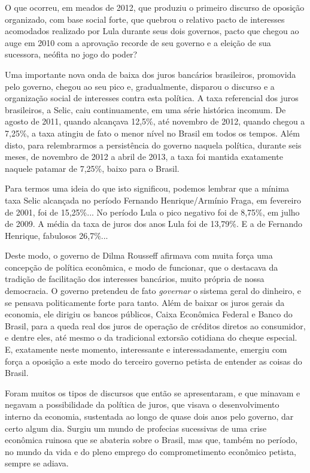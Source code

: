 O que ocorreu, em meados de 2012, que produziu o primeiro discurso de
oposição organizado, com base social forte, que quebrou o relativo pacto
de interesses acomodados realizado por Lula durante seus dois governos,
pacto que chegou ao auge em 2010 com a aprovação recorde de seu governo
e a eleição de sua sucessora, neófita no jogo do poder?

Uma importante nova onda de baixa dos juros bancários brasileiros,
promovida pelo governo, chegou ao seu pico e, gradualmente, disparou o
discurso e a organização social de interesses contra esta política. A
taxa referencial dos juros brasileiros, a Selic, caiu continuamente, em
uma série histórica incomum. De agosto de 2011, quando alcançava 12,5\%,
até novembro de 2012, quando chegou a 7,25\%, a taxa atingiu de fato o
menor nível no Brasil em todos os tempos. Além disto, para relembrarmos
a persistência do governo naquela política, durante seis meses, de
novembro de 2012 a abril de 2013, a taxa foi mantida exatamente naquele
patamar de 7,25\%, baixo para o Brasil.

Para termos uma ideia do que isto significou, podemos lembrar que a
mínima taxa Selic alcançada no período Fernando Henrique/Armínio Fraga,
em fevereiro de 2001, foi de 15,25\%... No período Lula o pico negativo
foi de 8,75\%, em julho de 2009. A média da taxa de juros dos anos Lula
foi de 13,79\%. E a de Fernando Henrique, fabulosos 26,7\%...

Deste modo, o governo de Dilma Rousseff afirmava com muita força uma
concepção de política econômica, e modo de funcionar, que o destacava da
tradição de facilitação dos interesses bancários, muito própria de nossa
democracia. O governo pretendeu de fato \emph{governar} o sistema geral
do dinheiro, e se pensava politicamente forte para tanto. Além de baixar
os juros gerais da economia, ele dirigiu os bancos públicos, Caixa
Econômica Federal e Banco do Brasil, para a queda real dos juros de
operação de créditos diretos ao consumidor, e dentre eles, até mesmo o
da tradicional extorsão cotidiana do cheque especial. E, exatamente
neste momento, interessante e interessadamente, emergiu com força a
oposição a este modo do terceiro governo petista de entender as coisas
do Brasil.

Foram muitos os tipos de discursos que então se apresentaram, e que
minavam e negavam a possibilidade da política de juros, que visava o
desenvolvimento interno da economia, sustentada ao longo de quase dois
anos pelo governo, dar certo algum dia. Surgiu um mundo de profecias
sucessivas de uma crise econômica ruinosa que se abateria sobre o
Brasil, mas que, também no período, no mundo da vida e do pleno emprego
do comprometimento econômico petista, sempre se adiava.

